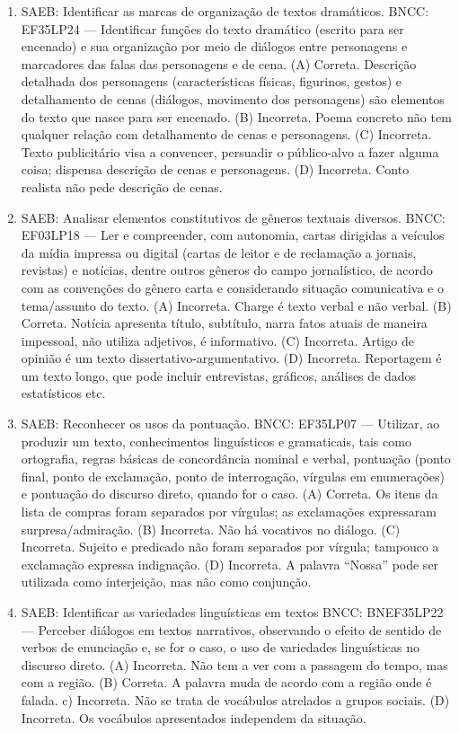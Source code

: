 \begin{enumerate}
\item
SAEB: Identificar as marcas de organização de textos dramáticos. 
BNCC: EF35LP24 --- Identificar funções do texto dramático (escrito para ser encenado) e sua organização por meio de diálogos entre personagens e marcadores das falas das personagens e de cena. 
(A) Correta. Descrição detalhada dos personagens (características físicas, figurinos, gestos) e detalhamento de cenas (diálogos, movimento dos personagens) são elementos do texto que nasce para ser encenado. 
(B) Incorreta. Poema concreto não tem qualquer relação com detalhamento de cenas e personagens.
(C) Incorreta. Texto publicitário visa a convencer, persuadir o público-alvo a fazer alguma coisa; dispensa descrição de cenas e personagens.
(D) Incorreta. Conto realista não pede descrição de cenas.

\item
SAEB: Analisar elementos constitutivos de gêneros textuais diversos. 
BNCC: EF03LP18 --- Ler e compreender, com autonomia, cartas dirigidas a veículos da mídia impressa ou digital (cartas de leitor e de reclamação a jornais, revistas) e notícias, dentre outros gêneros do campo jornalístico, de acordo com as convenções do gênero carta e considerando situação comunicativa e o tema/assunto do texto. 
(A) Incorreta. Charge é texto verbal e não verbal. 
(B) Correta. Notícia apresenta título, subtítulo, narra fatos atuais de maneira impessoal, não utiliza adjetivos, é informativo. 
(C) Incorreta. Artigo de opinião é um texto dissertativo-argumentativo. 
(D) Incorreta. Reportagem é um texto longo, que pode incluir entrevistas,
gráficos, análises de dados estatísticos etc.

\item
SAEB: Reconhecer os usos da pontuação. 
BNCC: EF35LP07 --- Utilizar, ao produzir um texto, conhecimentos linguísticos e gramaticais, tais como ortografia, regras básicas de concordância nominal e verbal, pontuação (ponto final, ponto de exclamação, ponto de interrogação, vírgulas em enumerações) e pontuação do discurso direto, quando for o caso. 
(A) Correta. Os itens da lista de compras foram separados por vírgulas; as exclamações expressaram surpresa/admiração. 
(B) Incorreta. Não há vocativos no diálogo. 
(C) Incorreta. Sujeito e predicado não foram separados por vírgula; tampouco a exclamação expressa indignação. 
(D) Incorreta. A palavra ``Nossa'' pode ser utilizada como interjeição, mas não como conjunção.

\item
SAEB: Identificar as variedades linguísticas em textos BNCC: BNEF35LP22 --- Perceber diálogos em textos narrativos, observando o efeito de sentido de verbos de enunciação e, se for o caso, o uso de variedades linguísticas no discurso direto. 
(A) Incorreta. Não tem a ver com a passagem do tempo, mas com a região. 
(B) Correta. A palavra muda de acordo com a região onde é falada. c) Incorreta. Não se trata de vocábulos atrelados a grupos sociais. (D) Incorreta. Os vocábulos apresentados independem da situação.


\end{enumerate}
